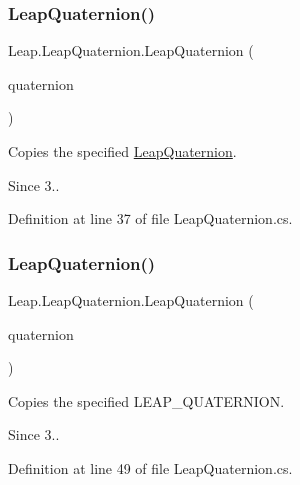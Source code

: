 \subsubsection{\texorpdfstring{LeapQuaternion()}{LeapQuaternion()}\hspace{0.1cm}{\footnotesize\ttfamily [2/3]}}
{\footnotesize\ttfamily Leap.\+Leap\+Quaternion.\+Leap\+Quaternion (\begin{DoxyParamCaption}\item[{\mbox{\hyperlink{struct_leap_1_1_leap_quaternion}{Leap\+Quaternion}}}]{quaternion }\end{DoxyParamCaption})}



Copies the specified \mbox{\hyperlink{struct_leap_1_1_leap_quaternion}{Leap\+Quaternion}}. 

\begin{DoxySince}{Since}
3.. 
\end{DoxySince}


Definition at line 37 of file Leap\+Quaternion.\+cs.

\mbox{\label{struct_leap_1_1_leap_quaternion_a6c606ed0513cfbc84cd820ffdd993cb0}} 
\subsubsection{\texorpdfstring{LeapQuaternion()}{LeapQuaternion()}\hspace{0.1cm}{\footnotesize\ttfamily [3/3]}}
{\footnotesize\ttfamily Leap.\+Leap\+Quaternion.\+Leap\+Quaternion (\begin{DoxyParamCaption}\item[{\mbox{\hyperlink{struct_leap_internal_1_1_l_e_a_p___q_u_a_t_e_r_n_i_o_n}{Leap\+Internal.\+L\+E\+A\+P\+\_\+\+Q\+U\+A\+T\+E\+R\+N\+I\+ON}}}]{quaternion }\end{DoxyParamCaption})}



Copies the specified L\+E\+A\+P\+\_\+\+Q\+U\+A\+T\+E\+R\+N\+I\+ON. 

\begin{DoxySince}{Since}
3.. 
\end{DoxySince}


Definition at line 49 of file Leap\+Quaternion.\+cs.



